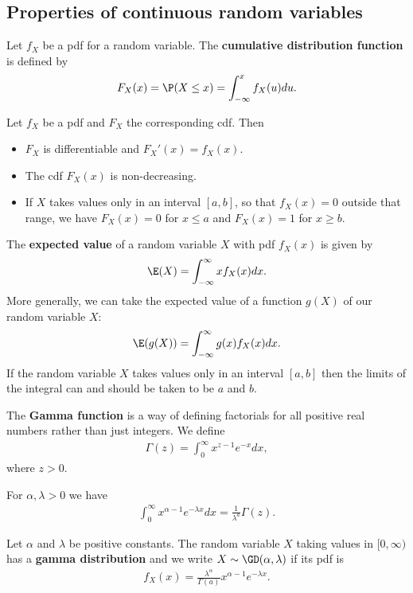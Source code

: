 \documentclass{article}
\begin{document}
\subsection{Properties of continuous random variables}
\begin{definition}
	Let $f_X$ be a pdf for a random variable. The \textbf{cumulative distribution
		function} is defined by
	\begin{align*}
		F_X(x) = \P(X\leq x) = \int_{-\infty}^x f_X(u)du.
	\end{align*}
\end{definition}
\begin{proposition}
	Let $f_X$ be a pdf and $F_X$ the corresponding cdf. Then
	\begin{itemize}
		\item $F_X$ is differentiable and $F_X'(x) = f_X(x)$.
		\item The cdf $F_X(x)$ is non-decreasing.
		\item If $X$ takes values only in an interval $[a,b]$, so that
		      $f_X(x)=0$ outside that range, we have
		      $F_X(x)=0$ for $x\leq a$ and $F_X(x)=1$ for $x\geq b$.
	\end{itemize}
\end{proposition}
\begin{definition}
	The \textbf{expected value} of a random variable $X$ with pdf $f_X(x)$
	is given by
	\begin{align*}
		\E(X) = \int_{-\infty}^\infty xf_X(x) dx.
	\end{align*}
	More generally, we can take the expected value of a function
	$g(X)$ of our random variable $X$:
	\begin{align*}
		\E(g(X)) = \int_{-\infty}^\infty g(x) f_X(x)dx.
	\end{align*}
	If the random variable $X$ takes values only in an interval
	$[a,b]$ then the limits of the integral can and should be taken
	to be $a$ and $b$.
\end{definition}
\begin{definition}
	The \textbf{Gamma function} is a way of defining factorials for all
	positive real numbers rather than just integers. We define
	\begin{align*}
		\Gamma(z) = \int_0^\infty x^{z-1}e^{-x}dx,
	\end{align*}
	where $z>0$.
\end{definition}
\begin{theorem}
	For $\alpha,\lambda>0$ we have
	\begin{align*}
		\int_0^\infty x^{\alpha -1}e^{-\lambda x} dx = \frac{1}{\lambda^a}\Gamma(z).
	\end{align*}
\end{theorem}
\begin{definition}
	Let $\alpha$ and $\lambda$ be positive constants. The random variable
	$X$ taking values in $[0,\infty)$ has a \textbf{gamma distribution} and we
	write $X\sim\GD(\alpha, \lambda)$ if its pdf is
	\begin{align*}
		f_X(x) = \frac{\lambda^\alpha}{\Gamma(a)}x^{\alpha-1}e^{-\lambda x}.
	\end{align*}
\end{definition}
\end{document}

